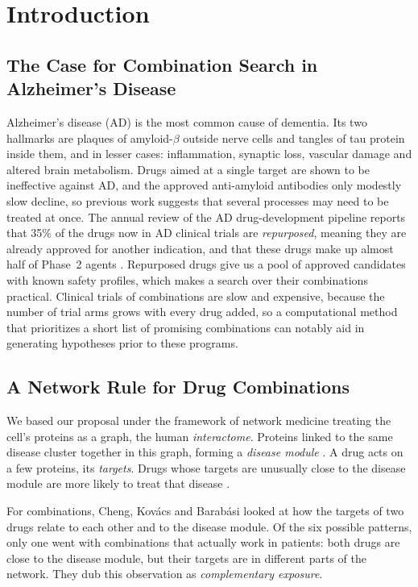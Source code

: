 \section{Introduction}
\label{sec:intro}

\subsection{The Case for Combination Search in Alzheimer’s Disease}

Alzheimer's disease (AD) is the most common cause of dementia. Its two hallmarks are plaques of amyloid-$\beta$ outside nerve cells and tangles of tau protein inside them, and in lesser cases: inflammation, synaptic loss, vascular damage and altered brain metabolism. Drugs aimed at a single target are shown to be ineffective against AD, and the approved anti-amyloid antibodies only modestly slow decline, so previous work suggests that several processes may need to be treated at once. The annual review of the AD drug-development pipeline reports that 35\% of the drugs now in AD clinical trials are \emph{repurposed}, meaning they are already approved for another indication, and that these drugs make up almost half of Phase~2 agents \cite{cummings2026pipeline}. Repurposed drugs give us a pool of approved candidates with known safety profiles, which makes a search over their combinations practical. Clinical trials of combinations are slow and expensive, because the number of trial arms grows with every drug added, so a computational method that prioritizes a short list of promising combinations can notably aid in generating hypotheses prior to these programs.

\subsection{A Network Rule for Drug Combinations}

We based our proposal under the framework of network medicine treating the cell's proteins as a graph, the human \emph{interactome}. Proteins linked to the same disease cluster together in this graph, forming a \emph{disease module} \cite{barabasi2011network,menche2015uncovering}. A drug acts on a few proteins, its \emph{targets}. Drugs whose targets are unusually close to the disease module are more likely to treat that disease \cite{guney2016network}.

For combinations, Cheng, Kov\'acs and Barab\'asi \cite{cheng2019combinations} looked at how the targets of two drugs relate to each other and to the disease module. Of the six possible patterns, only one went with combinations that actually work in patients: both drugs are close to the disease module, but their targets are in different parts of the network. They dub this observation as \emph{complementary exposure}.

